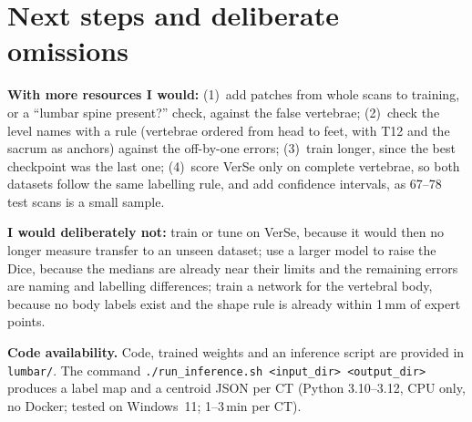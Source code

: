 \documentclass[10pt,a4paper]{article}
\begin{document}
\section{Next steps and deliberate omissions}
\textbf{With more resources I would:}
(1)~add patches from whole scans to training, or a ``lumbar spine present?'' check, against the false vertebrae;
(2)~check the level names with a rule (vertebrae ordered from head to feet, with T12 and the sacrum as anchors) against the off-by-one errors;
(3)~train longer, since the best checkpoint was the last one;
(4)~score VerSe only on complete vertebrae, so both datasets follow the same labelling rule, and add confidence intervals, as 67--78 test scans is a small sample.

\textbf{I would deliberately not:}
train or tune on VerSe, because it would then no longer measure transfer to an unseen dataset;
use a larger model to raise the Dice, because the medians are already near their limits and the remaining errors are naming and labelling differences;
train a network for the vertebral body, because no body labels exist and the shape rule is already within 1\,mm of expert points.

\textbf{Code availability.} Code, trained weights and an inference script are provided in \texttt{lumbar/}. The command \texttt{./run\_inference.sh <input\_dir> <output\_dir>} produces a label map and a centroid JSON per CT (Python 3.10--3.12, CPU only, no Docker; tested on Windows~11; 1--3\,min per CT).
\end{document}
